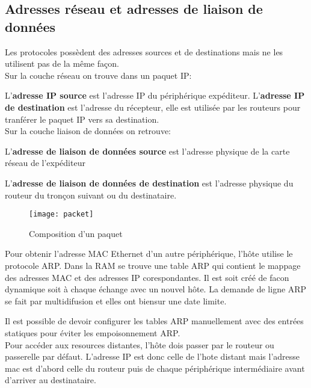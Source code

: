  \subsection{Adresses réseau et adresses de liaison de données}
 Les protocoles possèdent des adresses sources et de destinations mais ne les utilisent pas de la même façon.\\

 \indent
 Sur la couche réseau on trouve dans un paquet IP\@:

 \indent
 L'\textbf{adresse IP source} est l'adresse IP du périphérique expéditeur.
 \indent
 L'\textbf{adresse IP de destination} est l'adresse du récepteur, elle est utilisée par les routeurs pour tranférer le paquet IP vers sa destination.\\

 \indent
 Sur la couche liaison de données on retrouve:

 \indent
 L'\textbf{adresse de liaison de données source} est l'adresse physique de la carte réseau de l'expéditeur

 \indent
 L'\textbf{adresse de liaison de données de destination} est l'adresse physique du routeur du tronçon suivant ou du destinataire.\\

 \indent
 \begin{figure}[h]
	 \centering
	 \texttt{[image: packet]}
	 \caption{Composition d'un paquet}
 \end{figure}
 Pour obtenir l'adresse MAC Ethernet d'un autre périphérique, l'hôte utilise le protocole ARP\@. Dans la RAM se trouve une table ARP qui contient le mappage des adresses MAC et des adresses IP corespondantes. Il est soit créé de facon dynamique soit à chaque échange avec un nouvel hôte. La demande de ligne ARP se fait par multidifusion et elles ont biensur une date limite.

 \indent
 Il est possible de devoir configurer les tables ARP manuellement avec des entrées statiques pour éviter les empoisonnement ARP\@.\\

 \indent
 Pour accéder aux resources distantes, l'hôte dois passer par le routeur ou passerelle par défaut. L'adresse IP est donc celle de l'hote distant mais l'adresse mac est d'abord celle du routeur puis de chaque périphérique intermédiaire avant d'arriver au destinataire.





